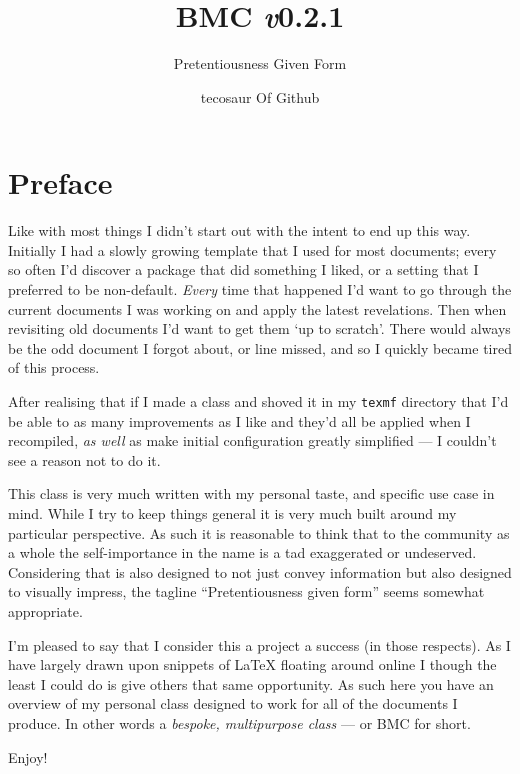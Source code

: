 \documentclass[solid,math,chem,code,plot,gloss]{bmc}
\title{\texorpdfstring{BMC \hfill \fontsize{1.35cm}{1.35cm}\fontseries{t}\selectfont \emph{v}0.2.1}{BMC v0.2.1}}
\subtitle{Pretentiousness Given Form}
\author{tecosaur \footnotesize \newline Of Github}
\begin{document}
\maketitle

\section*{Preface}

\vspace{1cm}

Like with most things I didn't start out with the intent to end up this way.
Initially I had a slowly growing template that I used for most documents;
every so often I'd discover a package that did something I liked,
or a setting that I preferred to be non-default.
\emph{Every} time that happened I'd want to go through the current documents I was working on
and apply the latest revelations.
Then when revisiting old documents I'd want to get them `up to scratch'.
There would always be the odd document I forgot about, or line missed,
and so I quickly became tired of this process.

After realising that if I made a class and shoved it in my \verb|texmf|
directory that I'd be able to as many improvements as I like and they'd all
be applied when I recompiled, \emph{as well} as make initial configuration
greatly simplified --- I couldn't see a reason not to do it.

This class is very much written with my personal taste, and specific use case in mind.
While I try to keep things general it is very much built around my particular perspective.
As such it is reasonable to think that to the community as a whole the
self-importance in the name is a tad exaggerated or undeserved.
Considering that is also designed to not just convey information but also
designed to visually impress, the tagline ``Pretentiousness given form''
seems somewhat appropriate.

I'm pleased to say that I consider this a project a success (in those respects).
As I have largely drawn upon snippets of LaTeX floating around online
I though the least I could do is give others that same opportunity.
As such here you have an overview of my personal class
designed to work for all of the documents I produce.
In other words a \emph{bespoke, multipurpose class} --- or BMC for short.

\vspace{1cm}

Enjoy!
\end{document}
